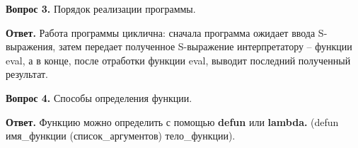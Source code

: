\documentclass[12pt]{report}
\begin{document}
\textbf{Вопрос 3.} Порядок реализации программы.

\textbf{Ответ.}
Работа программы циклична: сначала программа ожидает ввода S-выражения, затем передает полученное S-выражение интерпретатору – функции eval, а в конце, после отработки функции eval, выводит последний полученный результат.\newline

	
\textbf{Вопрос 4.} Способы определения функции.

\textbf{Ответ.}
Функцию можно определить с помощью \textbf{defun} или \textbf{lambda.} (defun имя\_функции (список\_аргументов) тело\_функции).
	
	
	
	
\end{document}
